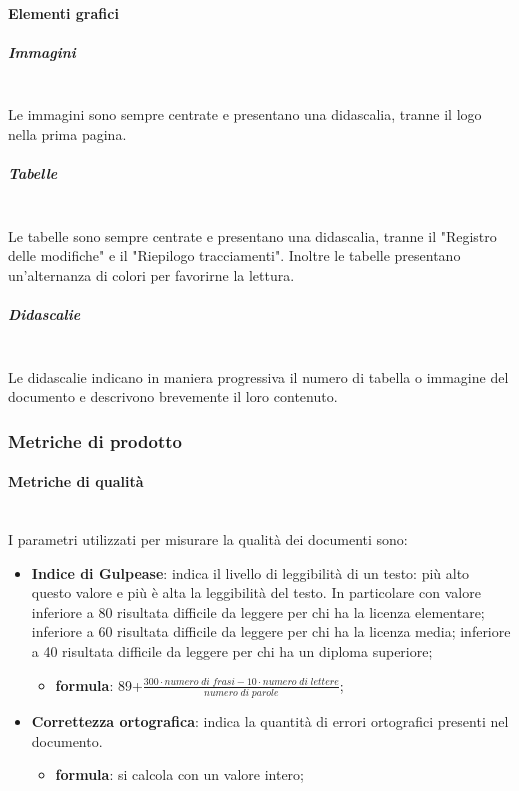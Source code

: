             \paragraph{Elementi grafici}
                \subparagraph{Immagini}\mbox{}\\ [1mm]
                    Le immagini sono sempre centrate e presentano una didascalia, tranne il logo nella prima pagina.
                \subparagraph{Tabelle}\mbox{}\\ [1mm]
                    Le tabelle sono sempre centrate e presentano una didascalia, tranne il "Registro delle modifiche" e il "Riepilogo tracciamenti".
                    Inoltre le tabelle presentano un'alternanza di colori per favorirne la lettura.
                \subparagraph{Didascalie}\mbox{}\\ [1mm]
                    Le didascalie indicano in maniera progressiva il numero di tabella o immagine del documento e descrivono brevemente il loro contenuto.
            \subsubsection{Metriche di prodotto}
                \paragraph{Metriche di qualità}\mbox{}\\ [1mm]
           		I parametri utilizzati per misurare la qualità dei documenti sono:
                \begin{itemize}
                	\item \textbf{Indice di Gulpease}: indica il livello di leggibilità di un testo: più alto questo valore e più è alta la leggibilità del testo. In particolare con valore inferiore a 80 risultata difficile da leggere per chi ha la licenza elementare; inferiore a 60 risultata difficile da leggere per chi ha la licenza media; inferiore a 40 risultata difficile da leggere per chi ha un diploma superiore;
                	\begin{itemize}
                		\item[] \textbf{formula}: 89+$\frac{300\cdot numero \; di \; frasi-10\cdot numero \; di \; lettere}{numero \; di \; parole}$;
                	\end{itemize}                	
                	\item \textbf{Correttezza ortografica}: indica la quantità di errori ortografici presenti nel documento.
                	\begin{itemize}
                		\item[] \textbf{formula}: si calcola con un valore intero;
                	\end{itemize}
                \end{itemize}                        
                
